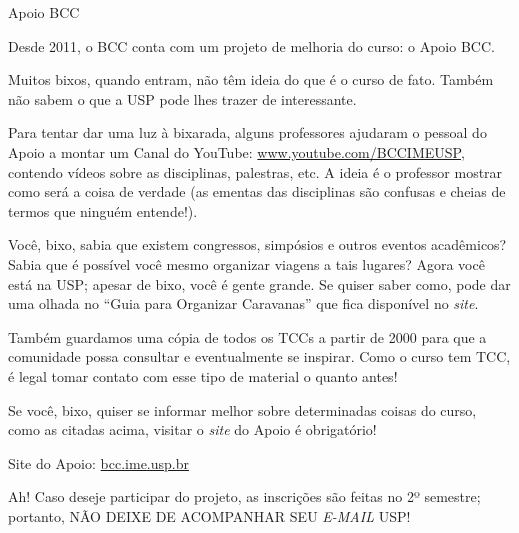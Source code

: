 \begin{subsubsecao}{Apoio BCC}

Desde 2011, o BCC conta com um projeto de melhoria do curso: o Apoio BCC.

Muitos bixos, quando entram, não têm ideia do que é o curso de fato. Também não 
sabem o que a USP pode lhes trazer de interessante.

Para tentar dar uma luz à bixarada, alguns professores ajudaram o pessoal do
Apoio a montar um Canal do YouTube: \url{www.youtube.com/BCCIMEUSP}, contendo vídeos sobre as disciplinas, palestras, etc. A ideia é o professor mostrar como será 
a coisa de verdade (as ementas das disciplinas são confusas e cheias de termos 
que ninguém entende!).

Você, bixo, sabia que existem congressos, simpósios e outros eventos acadêmicos? 
Sabia que é possível você mesmo organizar viagens a tais lugares? Agora você 
está na USP; apesar de bixo, você é gente grande. Se quiser saber como, pode dar uma 
olhada no ``Guia para Organizar Caravanas'' que fica disponível no \textit{site}.

Também guardamos uma cópia de todos os TCCs a partir de 2000 para que a 
comunidade possa consultar e eventualmente se inspirar. Como o curso tem TCC, é 
legal tomar contato com esse tipo de material o quanto antes!

Se você, bixo, quiser se informar melhor sobre determinadas coisas do curso, 
como as citadas acima, visitar o \textit{site} do Apoio é obrigatório!

Site do Apoio: \url{bcc.ime.usp.br}

Ah! Caso deseje participar do projeto, as inscrições são feitas no 2º 
semestre; portanto, NÃO DEIXE DE ACOMPANHAR SEU \textit{E-MAIL} USP!
\end{subsubsecao}
